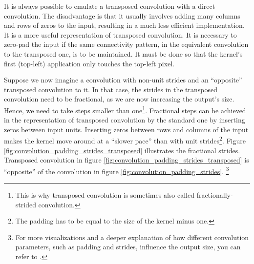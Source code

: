 It is always possible to emulate a transposed convolution with a direct convolution. The disadvantage is that it usually involves adding many columns and rows of zeros to the input, resulting in a much less efficient implementation. It is a more useful representation of transposed convolution. It is necessary to zero-pad the input if the same connectivity pattern, in the equivalent convolution to the transposed one, is to be maintained. It must be done so that the kernel's first (top-left) application only touches the top-left pixel.

Suppose we now imagine a convolution with non-unit strides and an ``opposite'' transposed convolution to it. In that case, the strides in the transposed convolution need to be fractional, as we are now increasing the output's size. Hence, we need to take steps smaller than one\footnote{This is why transposed convolution is sometimes also called fractionally-strided convolution.}. Fractional steps can be achieved in the representation of transposed convolution by the standard one by inserting zeros between input units. Inserting zeros between rows and columns of the input makes the kernel move around at a ``slower pace'' than with unit strides\footnote{The padding has to be equal to the size of the kernel minus one.}. Figure \ref{fig:convolution_padding_strides_transposed} illustrates the fractional strides. Transposed convolution in figure \ref{fig:convolution_padding_strides_transposed} is ``opposite'' of the convolution in figure \ref{fig:convolution_padding_strides}. \cite{convolutionguide}
\footnote{For more visualizations and a deeper explanation of how different convolution parameters, such as padding and strides, influence the output size, you can refer to \cite{convolutionguide}.}

